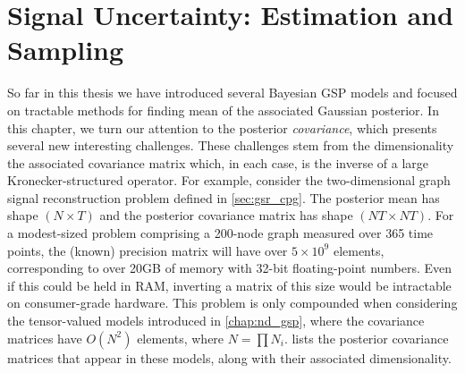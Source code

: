 \chapter{Signal Uncertainty: Estimation and Sampling} %

\label{chap:variance} %


So far in this thesis we have introduced several Bayesian GSP models and focused on tractable methods for finding mean of the associated Gaussian posterior. In this chapter, we turn our attention to the posterior \textit{covariance}, which presents several new interesting challenges. These challenges stem from the dimensionality the associated covariance matrix which, in each case, is the inverse of a large Kronecker-structured operator. For example, consider the two-dimensional graph signal reconstruction problem defined in \cref{sec:gsr_cpg}. The posterior mean has shape $(N \times T)$ and the posterior covariance matrix has shape $(NT \times NT)$. For a modest-sized problem comprising a 200-node graph measured over 365 time points, the (known) precision matrix will have over $5 \times 10^9$ elements, corresponding to over 20GB of memory with 32-bit floating-point numbers. Even if this could be held in RAM, inverting a matrix of this size would be intractable on consumer-grade hardware. This problem is only compounded when considering the tensor-valued models introduced in \cref{chap:nd_gsp}, where the covariance matrices have $O(N^2)$ elements, where $N = \prod N_i$.  lists the posterior covariance matrices that appear in these models, along with their associated dimensionality. 

\setcellgapes{8pt}
\makegapedcells

